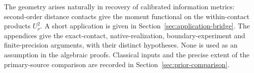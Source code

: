 The geometry arises naturally in recovery of calibrated information
metrics: second-order distance contacts give the moment functional
on the within-contact products $U_\nu^2$. A short application is
given in Section~\ref{sec:application-bridge}. The appendices give the exact-contact, native-realization,
boundary-experiment and finite-precision arguments, with their
distinct hypotheses. None
is used as an assumption in the algebraic proofs. Classical inputs
and the precise extent of the primary-source comparison are recorded
in Section~\ref{sec:prior-comparison}.
